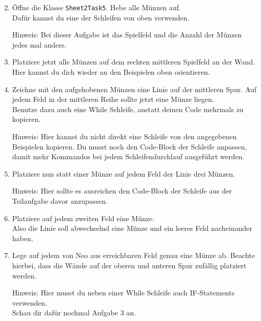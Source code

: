 \begin{enumerate} \setcounter{enumi}{1}
    \item Öffne die Klasse \lstinline{Sheet2Task5}.
        Hebe alle Münzen auf.\\
        Dafür kannst du eine der Schleifen von oben verwenden.

        Hinweis: Bei dieser Aufgabe ist das Spielfeld und die Anzahl der Münzen jedes mal anders.
    \item Platziere jetzt alle Münzen auf dem rechten mittleren Spielfeld an der Wand. 
        Hier kannst du dich wieder an den Beispielen oben orientieren.
    \item Zeichne mit den aufgehobenen Münzen eine Linie auf der mittleren Spur. 
        Auf jedem Feld in der mittleren Reihe sollte jetzt eine Münze liegen.\\
        Benutze dazu auch eine While Schleife, anstatt deinen Code mehrmals zu kopieren.

        Hinweis: Hier kannst du nicht direkt eine Schleife von den angegebenen Beispielen kopieren.
        Du musst noch den Code-Block der Schleife anpassen, damit mehr Kommandos bei jedem Schleifendurchlauf ausgeführt werden.
    \item Platziere nun statt einer Münze auf jedem Feld der Linie drei Münzen.
    
        Hinweis: Hier sollte es ausreichen den Code-Block der Schleife aus der Teilaufgabe davor anzupassen.
    \item Platziere auf jedem zweiten Feld eine Münze.\\
        Also die Linie soll abwechselnd eine Münze und ein leeres Feld nacheinander haben.
    \item \optional Lege auf jedem von Neo aus erreichbaren Feld genau eine Münze ab. 
        Beachte hierbei, dass die Wände auf der oberen und unteren Spur zufällig platziert werden.

        Hinweis: Hier musst du neben einer While Schleife auch IF-Statements verwenden.\\
        Schau dir dafür nochmal Aufgabe 3 an.
\end{enumerate}
